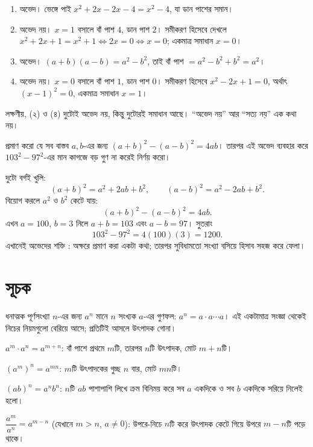 \documentclass[11pt]{article}
\begin{document}
\begin{sol}
\begin{enumerate}
  \item অভেদ। ভেঙ্গে পাই $x^2 + 2x - 2x - 4 = x^2 - 4$, যা ডান পাশের সমান।
  \item অভেদ নয়। $x = 1$ বসালে বাঁ পাশ $4$, ডান পাশ $2$। সমীকরণ হিসেবে দেখলে
        $x^2 + 2x + 1 = x^2 + 1 \iff 2x = 0 \iff x = 0$; একমাত্র সমাধান $x = 0$।
  \item অভেদ। $(a+b)(a-b) = a^2 - b^2$, তাই বাঁ পাশ $= a^2 - b^2 + b^2 = a^2$।
  \item অভেদ নয়। $x = 0$ বসালে বাঁ পাশ $1$, ডান পাশ $0$। সমীকরণ হিসেবে
        $x^2 - 2x + 1 = 0$, অর্থাৎ $(x-1)^2 = 0$, একমাত্র সমাধান $x = 1$।
\end{enumerate}
লক্ষণীয়, (২) ও (৪) দুটোই অভেদ নয়, কিন্তু দুটোরই সমাধান আছে। ``অভেদ নয়'' আর
``সত্য নয়'' এক কথা নয়।
\end{sol}

 প্রমাণ করো যে সব বাস্তব $a, b$-এর জন্য $(a+b)^2 - (a-b)^2 = 4ab$।
তারপর এই অভেদ ব্যবহার করে $103^2 - 97^2$-এর মান কাগজে বড় গুণ না করেই নির্ণয়
করো।

\begin{sol}
দুটো বর্গই খুলি:
\[
  (a+b)^2 = a^2 + 2ab + b^2, \qquad (a-b)^2 = a^2 - 2ab + b^2 .
\]
বিয়োগ করলে $a^2$ ও $b^2$ কেটে যায়:
\[
  (a+b)^2 - (a-b)^2 = 4ab .
\]
এখন $a = 100$, $b = 3$ নিলে $a + b = 103$ এবং $a - b = 97$। সুতরাং
\[
  103^2 - 97^2 = 4(100)(3) = 1200 .
\]
এখানেই অভেদের শক্তি : অক্ষরে প্রমাণ করা একটা কথা; তারপর সুবিধামতো সংখ্যা বসিয়ে
হিসাব সহজ করে ফেলা।
\end{sol}

\section{সূচক}

\begin{idea}[সূচক]
ধনাত্মক পূর্ণসংখ্যা $n$-এর জন্য $a^n$ মানে $n$ সংখ্যক $a$-এর গুণফল:
$a^n = a \cdot a \cdots a$। এই একটামাত্র সংজ্ঞা থেকেই নিচের নিয়মগুলো বেরিয়ে আসে; প্রতিটিই আসলে উৎপাদক গোনা।

\medskip
$a^m \cdot a^n = a^{m+n}$: বাঁ পাশে প্রথমে $m$টি, তারপর $n$টি উৎপাদক, মোট
$m+n$টি।

$(a^m)^n = a^{mn}$: $m$টি উৎপাদকের গুচ্ছ $n$ বার, মোট $mn$টি।

$(ab)^n = a^n b^n$: $n$টি $ab$ পাশাপাশি লিখে ক্রম বিনিময় করে সব $a$ একদিকে ও
সব $b$ একদিকে সরিয়ে নিলেই হলো।

$\dfrac{a^m}{a^n} = a^{m-n}$ (যেখানে $m > n$, $a \neq 0$): উপরে-নিচে $n$টি করে
উৎপাদক কেটে গিয়ে উপরে $m - n$টি পড়ে থাকে।
\end{idea}
\end{document}
